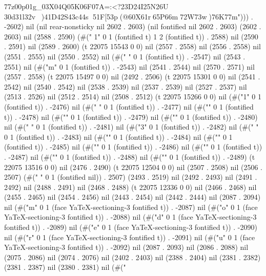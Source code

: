 {{\277z\300p\301g_\303X\304Q\305K\306F\307A=:<?\323D\324I\325N\326U\\\330d\331l\332v)\341D\342S\343c\344s
\351F[\353p(@\360X\361r\365P\366m\372W\373w)\376K\377m"))) . -2602) nil (nil rear-nonsticky nil 2602 . 2603) (nil fontified nil 2602 . 2603) (2602 . 2603) nil (2588 . 2590) (#("
1" 0 1 (fontified t) 1 2 (fontified t)) . 2588) nil (2590 . 2591) nil (2589 . 2600) (t 22075 15543 0 0) nil (2557 . 2558) nil (2556 . 2558) nil (2551 . 2555) nil (2550 . 2552) nil (#(" " 0 1 (fontified t)) . -2547) nil (2543 . 2551) nil (#("m" 0 1 (fontified t)) . -2543) nil (2541 . 2544) nil (2570 . 2571) nil (2557 . 2558) (t 22075 15497 0 0) nil (2492 . 2506) (t 22075 15301 0 0) nil (2541 . 2542) nil (2540 . 2542) nil (2538 . 2539) nil (2537 . 2539) nil (2527 . 2537) nil (2513 . 2526) nil (2512 . 2514) nil (2508 . 2512) (t 22075 15266 0 0) nil (#("1" 0 1 (fontified t)) . -2476) nil (#(" " 0 1 (fontified t)) . -2477) nil (#("" 0 1 (fontified t)) . -2478) nil (#("" 0 1 (fontified t)) . -2479) nil (#("" 0 1 (fontified t)) . -2480) nil (#(" " 0 1 (fontified t)) . -2481) nil (#("3" 0 1 (fontified t)) . -2482) nil (#(" " 0 1 (fontified t)) . -2483) nil (#("" 0 1 (fontified t)) . -2484) nil (#("" 0 1 (fontified t)) . -2485) nil (#("" 0 1 (fontified t)) . -2486) nil (#("" 0 1 (fontified t)) . -2487) nil (#("" 0 1 (fontified t)) . -2488) nil (#("" 0 1 (fontified t)) . -2489) (t 22075 13516 0 0) nil (2476 . 2490) (t 22075 12504 0 0) nil (2507 . 2508) nil (2506 . 2507) (#(" " 0 1 (fontified nil)) . 2507) (2493 . 2519) nil (2492 . 2493) nil (2491 . 2492) nil (2488 . 2491) nil (2468 . 2488) (t 22075 12336 0 0) nil (2466 . 2468) nil (2455 . 2465) nil (2454 . 2456) nil (2443 . 2454) nil (2442 . 2444) nil (2087 . 2094) nil (#("m" 0 1 (face YaTeX-sectioning-3 fontified t)) . -2087) nil (#("o" 0 1 (face YaTeX-sectioning-3 fontified t)) . -2088) nil (#("d" 0 1 (face YaTeX-sectioning-3 fontified t)) . -2089) nil (#("e" 0 1 (face YaTeX-sectioning-3 fontified t)) . -2090) nil (#("r" 0 1 (face YaTeX-sectioning-3 fontified t)) . -2091) nil (#("u" 0 1 (face YaTeX-sectioning-3 fontified t)) . -2092) nil (2087 . 2093) nil (2086 . 2088) nil (2075 . 2086) nil (2074 . 2076) nil (2402 . 2403) nil (2388 . 2404) nil (2381 . 2382) (2381 . 2387) nil (2380 . 2381) nil (#("
}}
